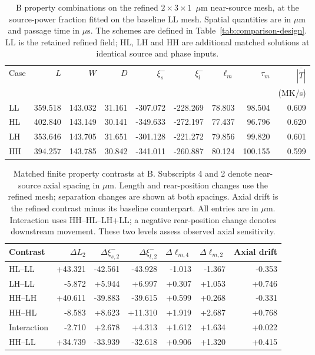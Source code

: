 \documentclass[preprint,12pt]{elsarticle}
\newcommand{\um}{\ensuremath{\mu\mathrm{m}}}
\newcommand{\us}{\ensuremath{\mu\mathrm{s}}}
\begin{document}
\begin{table}[htbp]
\centering
\small
\setlength{\tabcolsep}{4pt}
\caption{B property combinations on the refined $2\times3\times1$~\um{} near-source mesh, at the source-power fraction fitted on the baseline LL mesh. Spatial quantities are in \um{} and passage time in \us. The schemes are defined in Table~\ref{tab:comparison-design}. LL is the retained refined field; HL, LH and HH are additional matched solutions at identical source and phase inputs.}
\label{tab:refined-properties}
\begin{tabular}{lrrrrrrrr}
\toprule
Case & $L$ & $W$ & $D$ & $\xi_s^-$ & $\xi_l^-$ & $\ell_m$ & $\tau_m$ & $\overline{|\dot T|}$\\
 & & & & & & & & (MK/s)\\
\midrule
LL & 359.518 & 143.032 & 31.161 & -307.072 & -228.269 & 78.803 & 98.504 & 0.609\\
HL & 402.840 & 143.149 & 30.141 & -349.633 & -272.197 & 77.437 & 96.796 & 0.620\\
LH & 353.646 & 143.705 & 31.651 & -301.128 & -221.272 & 79.856 & 99.820 & 0.601\\
HH & 394.257 & 143.785 & 30.842 & -341.011 & -260.887 & 80.124 & 100.155 & 0.599\\
\bottomrule
\end{tabular}
\end{table}

\begin{table}[htbp]
\centering
\small
\setlength{\tabcolsep}{4pt}
\caption{Matched finite property contrasts at B. Subscripts 4 and 2 denote near-source axial spacing in \um. Length and rear-position changes use the refined mesh; separation changes are shown at both spacings. Axial drift is the refined contrast minus its baseline counterpart. All entries are in \um. Interaction uses HH--HL--LH+LL; a negative rear-position change denotes downstream movement. These two levels assess observed axial sensitivity.}
\label{tab:paired-axial-effects}
\begin{tabular}{lrrrrrr}
\toprule
Contrast & $\Delta L_{2}$ & $\Delta\xi_{s,2}^-$ & $\Delta\xi_{l,2}^-$ & $\Delta\ell_{m,4}$ & $\Delta\ell_{m,2}$ & Axial drift\\
\midrule
HL--LL & +43.321 & -42.561 & -43.928 & -1.013 & -1.367 & -0.353\\
LH--LL & -5.872 & +5.944 & +6.997 & +0.307 & +1.053 & +0.746\\
HH--LH & +40.611 & -39.883 & -39.615 & +0.599 & +0.268 & -0.331\\
HH--HL & -8.583 & +8.623 & +11.310 & +1.919 & +2.687 & +0.768\\
Interaction & -2.710 & +2.678 & +4.313 & +1.612 & +1.634 & +0.022\\
HH--LL & +34.739 & -33.939 & -32.618 & +0.906 & +1.320 & +0.415\\
\bottomrule
\end{tabular}
\end{table}
\end{document}
